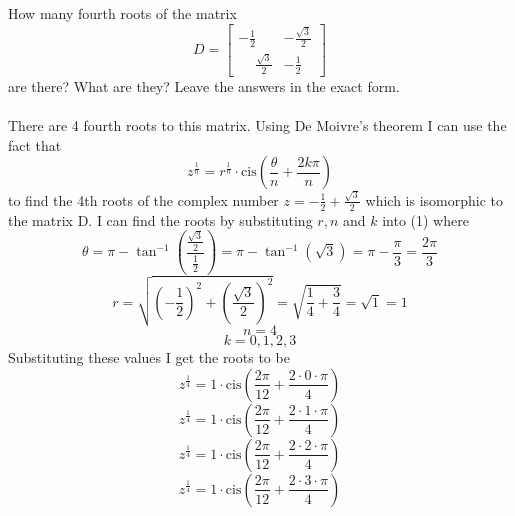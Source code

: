 \documentclass[titlepage]{article}
\newenvironment{problem}[2][Problem]{\begin{trivlist}
\item[\hskip \labelsep {\bfseries #1}\hskip \labelsep {\bfseries #2.}]}{\end{trivlist}}
\begin{document}
\begin{problem}{5}
How many fourth roots of the matrix
$$D = \begin{bmatrix}-\frac{1}{2} & -\frac{\sqrt{3}}{2} \\ \phantom{-} \frac{\sqrt{3}}{2} & -\frac{1}{2} \end{bmatrix} $$
are there? What are they? Leave the answers in the exact form.
\\ \\
There are 4 fourth roots to this matrix. Using De Moivre's theorem I can use the fact that 
 \begin{equation}z^{\frac{1}{n}} = r^{\frac{1}{n}}\cdot \text{cis}{\left(\frac{\theta}{n} + \frac{2k\pi}{n}\right)} \end{equation} to find the 4th roots of the complex number $z = -\frac{1}{2} + \frac{\sqrt{3}}{2}$ which is isomorphic to the matrix D. I can find the roots by substituting $r, n$ and $k$ into (1) where 
 $$\theta = \pi - \tan^{-1}(\frac{\frac{\sqrt{3}}{2}}{\frac{1}{2}}) = \pi-\tan^{-1}{\left(\sqrt{3}\right)} = \pi - \frac{\pi}{3} = \frac{2\pi}{3} $$
 $$r = \sqrt{\left(-\frac{1}{2}\right)^2 + \left(\frac{\sqrt{3}}{2}\right)^2} = \sqrt{\frac{1}{4} + \frac{3}{4}} = \sqrt{1} = 1$$
 $$n = 4$$
 $$ k = 0,1,2,3$$
 Substituting these values I get the roots to be
$$z^{\frac{1}{4}} = 1\cdot \text{cis}\left(\frac{2\pi}{12} + \frac{2\cdot0\cdot\pi}{4}\right) $$
$$z^{\frac{1}{4}} = 1\cdot \text{cis}\left(\frac{2\pi}{12} + \frac{2\cdot1\cdot\pi}{4}\right) $$
$$z^{\frac{1}{4}} = 1\cdot \text{cis}\left(\frac{2\pi}{12} + \frac{2\cdot2\cdot\pi}{4}\right) $$
$$z^{\frac{1}{4}} = 1\cdot \text{cis}\left(\frac{2\pi}{12} + \frac{2\cdot3\cdot\pi}{4}\right) $$
\end{problem}
\end{document}
